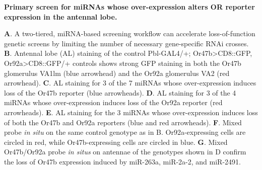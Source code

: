 {\bf Primary screen for miRNAs whose over-expression alters OR reporter expression in the antennal lobe.}

\textbf{A}.
A two-tiered, miRNA-based screening workflow can accelerate loss-of-function genetic screens by limiting the number of necessary gene-specific RNAi crosses.
\textbf{B}.
Antennal lobe (AL) staining of the control Pbl-GAL4/+; Or47b\textgreater{}CD8::GFP, Or92a\textgreater{}CD8::GFP/+ controls shows strong GFP staining in both the Or47b glomerulus VA1lm (blue arrowhead) and the Or92a glomerulus VA2 (red arrowhead).
\textbf{C}.
AL staining for 3 of the 7 miRNAs whose over-expression induces loss of the Or47b reporter (blue arrowheads).
\textbf{D}.
AL staining for 3 of the 4 miRNAs whose over-expression induces loss of the Or92a reporter (red arrowheads).
\textbf{E}.
AL staining for the 3 miRNAs whose over-expression induces loss of both the Or47b and Or92a reporters (blue and red arrowheads).
\textbf{F}.
Mixed probe \emph{in situ} on the same control genotype as in B.
Or92a-expressing cells are circled in red, while Or47b-expressing cells are circled in blue.
\textbf{G}.
Mixed Or47b/Or92a probe \emph{in situs} on antennae of the genotypes shown in D confirm the loss of Or47b expression induced by miR-263a, miR-2a-2, and miR-2491.
\label{fig:1}